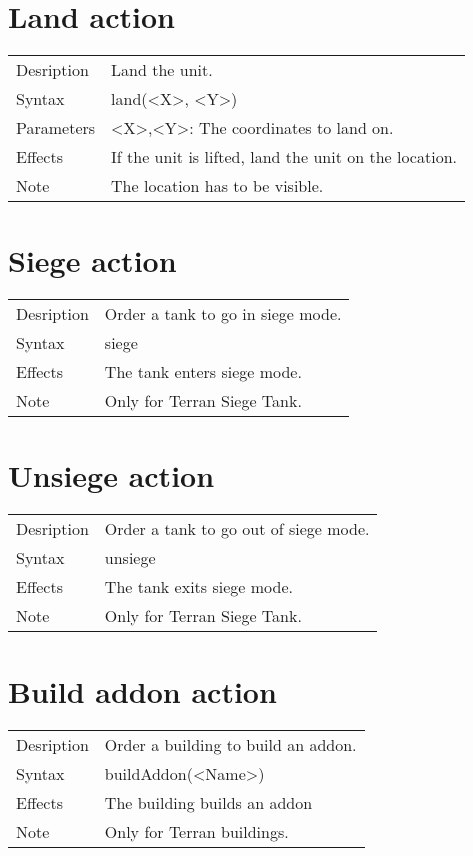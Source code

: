\documentclass[english,11pt]{report}
\begin{document}
\section{Land action}
\begin{tabularx}{\textwidth}{lX}
 Desription & Land the unit. \\
 Syntax & land(<X>, <Y>) \\
 Parameters & <X>,<Y>: The coordinates to land on.\\
 Effects &  If the unit is lifted, land the unit on the location.\\
 Note & The location has to be visible.
\end{tabularx}

\section{Siege action}
\begin{tabularx}{\textwidth}{lX}
 Desription & Order a tank to go in siege mode. \\
 Syntax & siege \\
 Effects &  The tank enters siege mode.\\
 Note & Only for Terran Siege Tank.
\end{tabularx}

\section{Unsiege action}
\begin{tabularx}{\textwidth}{lX}
 Desription & Order a tank to go out of siege mode. \\
 Syntax & unsiege \\
 Effects &  The tank exits siege mode.\\
 Note & Only for Terran Siege Tank.
\end{tabularx}

\section{Build addon action}
\begin{tabularx}{\textwidth}{lX}
 Desription & Order a building to build an addon. \\
 Syntax & buildAddon(<Name>) \\
 Effects &  The building builds an addon\\
 Note & Only for Terran buildings.
\end{tabularx}
\end{document}
